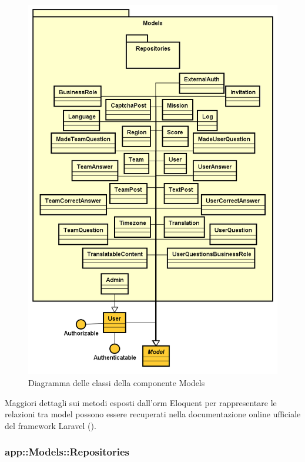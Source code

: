 \begin{figure}[H]
	\centering
  \includegraphics[scale=0.55]{immagini/components/models_diagram.png}
  \caption{Diagramma delle classi della componente Models}
	\label{fig:models} 
\end{figure}

Maggiori dettagli sui metodi esposti dall'\gls{orm}\glsfirstoccur{} Eloquent per rappresentare le relazioni tra model possono essere recuperati nella documentazione online ufficiale del framework Laravel (\cite{site:laravel-doc}).


\subsubsection{app::Models::Repositories} %

